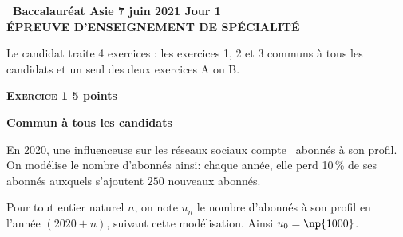 \documentclass[11pt]{article}
\begin{document}
\setlength\parindent{0mm}
\pagestyle{fancy}
\thispagestyle{empty}

\begin{center}{\Large\textbf{\decofourleft~Baccalauréat Asie 7 juin 2021 Jour 1~\decofourright\\[6pt] ÉPREUVE D'ENSEIGNEMENT DE SPÉCIALITÉ}}
\end{center}

\vspace{0,25cm}

Le candidat traite 4 exercices : les exercices 1, 2 et 3 communs à tous les candidats et un seul des deux exercices A ou B.

\bigskip

\textbf{\textsc{Exercice 1} \hfill 5 points}

\textbf{Commun à tous les candidats}

\medskip

En 2020, une influenceuse sur les réseaux sociaux compte ~abonnés à son profil. On modélise le nombre d'abonnés ainsi: chaque année, elle perd 10\,\% de ses abonnés auxquels s'ajoutent $250$ nouveaux abonnés.

Pour tout entier naturel $n$, on note $u_n$ le nombre d'abonnés à son profil en l'année $(2020 + n)$, suivant cette modélisation. Ainsi $u_0 = \np{1000}$.

\medskip
\end{document}
